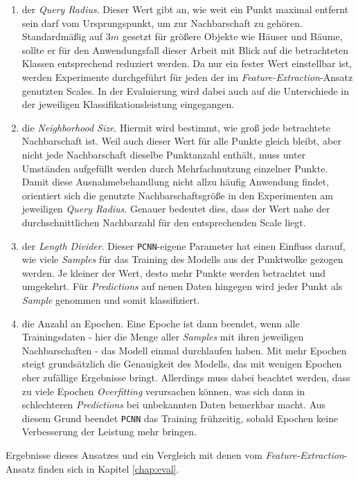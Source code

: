 \begin{enumerate}
    \item der \textit{Query Radius}. Dieser Wert gibt an, wie weit ein Punkt maximal entfernt sein darf vom Ursprungspunkt, um zur Nachbarschaft zu gehören. Standardmäßig auf 3$m$ gesetzt für größere Objekte wie Häuser und Bäume, sollte er für den Anwendungsfall dieser Arbeit mit Blick auf die betrachteten Klassen entsprechend reduziert werden. Da nur ein fester Wert einstellbar ist, werden Experimente durchgeführt für jeden der im \textit{Feature-Extraction}-Ansatz genutzten Scales. In der Evaluierung wird dabei auch auf die Unterschiede in der jeweiligen Klassifikationsleistung eingegangen. 
    \item die \textit{Neighborhood Size}. Hiermit wird bestimmt, wie groß jede betrachtete Nachbarschaft ist. Weil auch dieser Wert für alle Punkte gleich bleibt, aber nicht jede Nachbarschaft dieselbe Punktanzahl enthält, muss unter Umständen aufgefüllt werden durch Mehrfachnutzung einzelner Punkte. Damit diese Ausnahmebehandlung nicht allzu häufig Anwendung findet, orientiert sich die genutzte Nachbarschaftsgröße in den Experimenten am jeweiligen \textit{Query Radius}. Genauer bedeutet dies, dass der Wert nahe der durchschnittlichen Nachbarzahl für den entsprechenden Scale liegt.
    \item der \textit{Length Divider}. Dieser \texttt{PCNN}-eigene Parameter hat einen Einfluss darauf, wie viele \textit{Samples} für das Training des Modells aus der Punktwolke gezogen werden. Je kleiner der Wert, desto mehr Punkte werden betrachtet und umgekehrt. Für \textit{Predictions} auf neuen Daten hingegen wird jeder Punkt als \textit{Sample} genommen und somit klassifiziert.
    \item die Anzahl an Epochen. Eine Epoche ist dann beendet, wenn alle Trainingsdaten - hier die Menge aller \textit{Samples} mit ihren jeweiligen Nachbarschaften - das Modell einmal durchlaufen haben. Mit mehr Epochen steigt grundsätzlich die Genauigkeit des Modells, das mit wenigen Epochen eher zufällige Ergebnisse bringt. Allerdings muss dabei beachtet werden, dass zu viele Epochen \textit{Overfitting} verursachen können, was sich dann in schlechteren \textit{Predictions} bei unbekannten Daten bemerkbar macht. Aus diesem Grund beendet \texttt{PCNN} das Training frühzeitig, sobald Epochen keine Verbesserung der Leistung mehr bringen.
\end{enumerate} 
Ergebnisse dieses Ansatzes und ein Vergleich mit denen vom \textit{Feature-Extraction}-Ansatz finden sich in Kapitel \ref{chap:eval}.